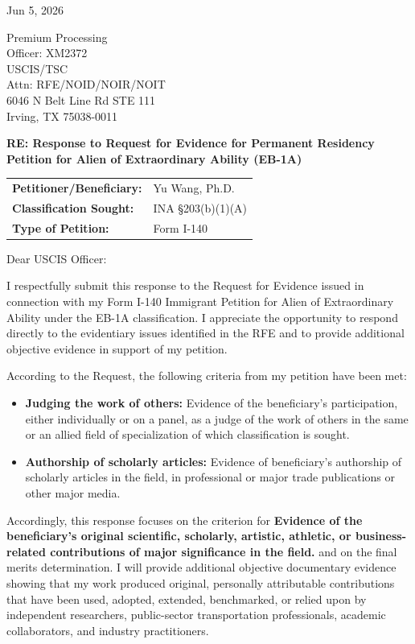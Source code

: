 \documentclass[11pt,letterpaper]{article}
\newcommand{\LetterDate}{Jun 5, 2026}
\newcommand{\Beneficiary}{Yu Wang, Ph.D.}
\newcommand{\Classification}{INA \S 203(b)(1)(A)}
\newcommand{\PetitionType}{Form I-140}
\newcommand{\Field}{Transportation Engineering}
\newcommand{\IntendedRole}{Lead Autonomy Engineer}
\newcommand{\USCISAddress}{%
Premium Processing\\
Officer: XM2372\\
USCIS/TSC\\
Attn: RFE/NOID/NOIR/NOIT\\
6046 N Belt Line Rd STE 111\\
Irving, TX 75038-0011%
}
\begin{document}
\doublespacing

\LetterDate

\vspace{1em}
\USCISAddress

\vspace{1.5em}
\textbf{RE: Response to Request for Evidence for Permanent Residency Petition for Alien of Extraordinary Ability (EB-1A)}

\begin{tabular}{@{}ll@{}}
\textbf{Petitioner/Beneficiary:} & \Beneficiary \\
\textbf{Classification Sought:} & \Classification \\
\textbf{Type of Petition:} & \PetitionType \\
\end{tabular}

\vspace{1em}
Dear USCIS Officer:

I respectfully submit this response to the Request for Evidence issued in connection with my Form I-140 Immigrant Petition for Alien of Extraordinary Ability under the EB-1A classification. I appreciate the opportunity to respond directly to the evidentiary issues identified in the RFE and to provide additional objective evidence in support of my petition.

According to the Request, the following criteria from my petition have been met:

\begin{itemize}
\item \textbf{Judging the work of others:} Evidence of the beneficiary's participation, either individually or on a panel, as a judge of the work of others in the same or an allied field of specialization of which classification is sought.
\item \textbf{Authorship of scholarly articles:} Evidence of beneficiary's authorship of scholarly articles in the field, in professional or major trade publications or other major media.
\end{itemize}

Accordingly, this response focuses on the criterion for \textbf{Evidence of the beneficiary's original scientific, scholarly, artistic, athletic, or business-related contributions of major significance in the field.} and on the final merits determination. I will provide additional objective documentary evidence showing that my work produced original, personally attributable contributions that have been used, adopted, extended, benchmarked, or relied upon by independent researchers, public-sector transportation professionals, academic collaborators, and industry practitioners.
\end{document}
